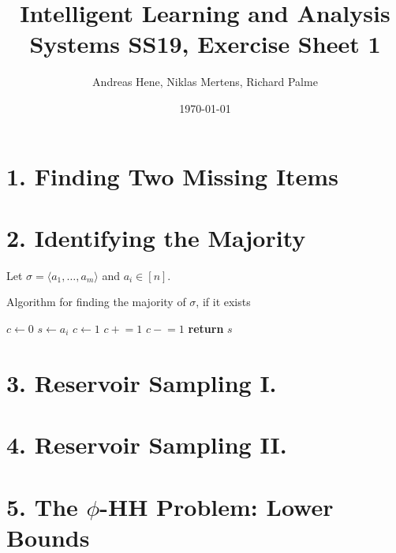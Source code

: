 \documentclass{article}
\newcommand{\pluseq}{\mathrel{+}=}
\newcommand{\minuseq}{\mathrel{-}=}
\begin{document}
\title{Intelligent Learning and Analysis Systems SS19, Exercise Sheet 1}
\author{Andreas Hene, Niklas Mertens, Richard Palme}
\date{\today}
\maketitle

\section*{1. Finding Two Missing Items}



\section*{2. Identifying the Majority}

Let $\sigma = \langle a_1, \hdots, a_m \rangle$ and $a_i \in [n]$. \\

\begin{algorithm}
\caption{Algorithm for finding the majority of $\sigma$, if it exists}
\begin{algorithmic}[1]

\State $c \gets 0$
        \State$s \gets a_i$
        \State$c \gets 1$
    \EndIf
        \State$c \pluseq 1$
    \Else
        \State$c \minuseq 1$
    \EndIf
\EndFor
\State\textbf{return} $s$

\end{algorithmic}
\end{algorithm}



\section*{3. Reservoir Sampling I.}



\section*{4. Reservoir Sampling II.}



\section*{5. The $\phi$-HH Problem: Lower Bounds}
\end{document}
